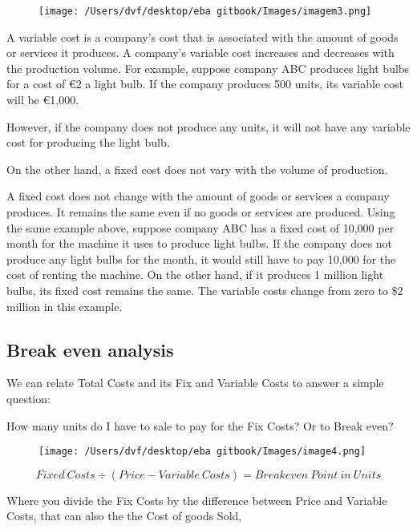 \documentclass[]{book}
\newcommand{\euro}{€}
\theoremstyle{definition}
\theoremstyle{definition}
\theoremstyle{definition}
\theoremstyle{remark}
\begin{document}
\begin{figure}[htbp]
\centering
\texttt{[image: /Users/dvf/desktop/eba gitbook/Images/imagem3.png]}
\caption{}
\end{figure}

A variable cost is a company's cost that is associated with the amount
of goods or services it produces. A company's variable cost increases
and decreases with the production volume. For example, suppose company
ABC produces light bulbs for a cost of \euro{}2 a light bulb. If the
company produces 500 units, its variable cost will be \euro{}1,000.

However, if the company does not produce any units, it will not have any
variable cost for producing the light bulb.

On the other hand, a fixed cost does not vary with the volume of
production.

A fixed cost does not change with the amount of goods or services a
company produces. It remains the same even if no goods or services are
produced. Using the same example above, suppose company ABC has a fixed
cost of 10,000 per month for the machine it uses to produce light bulbs.
If the company does not produce any light bulbs for the month, it would
still have to pay 10,000 for the cost of renting the machine. On the
other hand, if it produces 1 million light bulbs, its fixed cost remains
the same. The variable costs change from zero to \$2 million in this
example.

\subsection{Break even analysis}\label{break-even-analysis}

We can relate Total Costs and its Fix and Variable Costs to answer a
simple question:

How many units do I have to sale to pay for the Fix Costs? Or to Break
even?

\begin{figure}[htbp]
\centering
\texttt{[image: /Users/dvf/desktop/eba gitbook/Images/image4.png]}
\caption{}
\end{figure}

\[Fixed \ Costs ÷ (Price - Variable\ Costs) = Breakeven\ Point\ in \ Units\]

Where you divide the Fix Costs by the difference between Price and
Variable Costs, that can also the the Cost of goods Sold,
\end{document}

